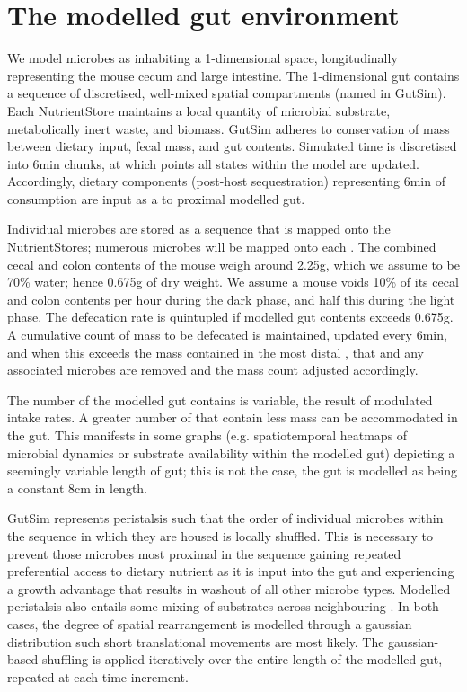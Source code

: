\documentclass{article}
\begin{document}

\section{The modelled gut environment}

We model microbes as inhabiting a 1-dimensional space, longitudinally representing the mouse cecum and large intestine. 
The 1-dimensional gut contains a sequence of discretised, well-mixed spatial compartments (named \nutstore in GutSim).
Each NutrientStore maintains a local quantity of microbial substrate, metabolically inert waste, and biomass. 
GutSim adheres to conservation of mass between dietary input, fecal mass, and gut contents. 
Simulated time is discretised into 6min chunks, at which points all states within the model are updated. 
Accordingly, dietary components (post-host sequestration) representing 6min of consumption are input as a \nutstore to proximal modelled gut.

Individual microbes are stored as a sequence that is mapped onto the NutrientStores; numerous microbes will be mapped onto each \nutstore.
The combined cecal and colon contents of the mouse weigh around 2.25g, which we assume to be 70\% water; hence 0.675g of dry weight. 
We assume a mouse voids 10\% of its cecal and colon contents per hour during the dark phase, and half this during the light phase. 
The defecation rate is quintupled if modelled gut contents exceeds 0.675g. 
A cumulative count of mass to be defecated is maintained, updated every 6min, and when this exceeds the mass contained in the most distal \nutstore, that \nutstore and any associated microbes are removed and the mass count adjusted accordingly. 

The number of \nutstores the modelled gut contains is variable, the result of modulated intake rates.
A greater number of \nutstores that contain less mass can be accommodated in the gut. 
This manifests in some graphs (e.g. spatiotemporal heatmaps of microbial dynamics or substrate availability within the modelled gut) depicting a seemingly variable length of gut; this is not the case, the gut is modelled as being a constant 8cm in length. 

GutSim represents peristalsis such that the order of individual microbes within the sequence in which they are housed is locally shuffled. 
This is necessary to prevent those microbes most proximal in the sequence gaining repeated preferential access to dietary nutrient as it is input into the gut and experiencing a growth advantage that results in washout of all other microbe types. 
Modelled peristalsis also entails some mixing of substrates across neighbouring \nutstores. 
In both cases, the degree of spatial rearrangement is modelled through a gaussian distribution such short translational movements are most likely.
The gaussian-based shuffling is applied iteratively over the entire length of the modelled gut, repeated at each time increment. 
\end{document}
